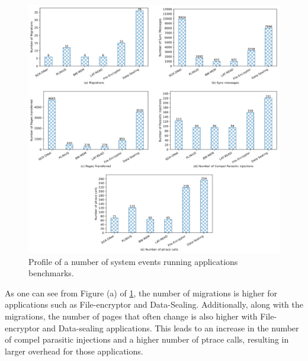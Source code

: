 \documentclass[article, doublespace,nopageskip]{VTthesis} %
\begin{document}
    \begin{figure}[H]
    \centering
    \includegraphics[scale=1.1]{figures/perf_char_monitor.png}
    \caption{Profile of a number of system events running applications benchmarks.} 
    \label{fig:client_instructions}
    \end{figure}

    As one can see from Figure (a) of \ref{fig:client_instructions}, the number of migrations is higher for applications such as File-encryptor and Data-Sealing. Additionally, along with the migrations, the number of pages that often change is also higher with File-encryptor and Data-sealing applications. This leads to an increase in the number of compel parasitic injections and a higher number of ptrace calls, resulting in larger overhead for those applications.
    
\end{document}
